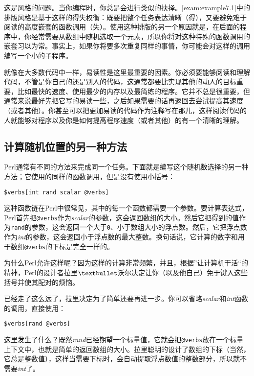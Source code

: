 这是风格的问题。当你编程时，你总是会进行类似的抉择。\autoref{exam:example7.1}中的排版风格是基于这样的得失权衡：既要把整个任务表达清晰（得），又要避免难于阅读的高度嵌套的函数调用（失）。使用这种排版的另一个原因就是，在后面的程序中，你经常需要从数组中随机选取一个元素，所以你将对这种特殊的函数调用的嵌套习以为常。事实上，如果你将要多次重复同样的事情，你可能会对这样的调用编写一个小的子程序。

就像在大多数代码中一样，易读性是这里最重要的因素。你必须要能够阅读和理解代码，不管是你自己的还是别人的代码，这通常都要比实现其他的动人的目标重要，比如最快的速度、使用最少的内存以及最简练的程序。它并不总是很重要，但通常来说最好先把它写的易读一些，之后如果需要的话再返回去尝试提高其速度（或者其他）。你甚至可以把更加易读的代码作为注释写在那儿，这样阅读代码的人就能够对程序以及你是如何提高程序速度（或者其他）的有一个清晰的理解。

\subsection{计算随机位置的另一种方法}
Perl通常有不同的方法来完成同一个任务。下面就是编写这个随机数选择的另一种方法；它使用的同样的函数调用，但是没有使用小括号：

\begin{lstlisting}
$verbs[int rand scalar @verbs]
\end{lstlisting}

这种函数链在Perl中很常见，其中的每一个函数都需要一个参数。要计算表达式，Perl首先把\verb|@verbs|作为\textit{scalar}的参数，这会返回数组的大小。然后它把得到的值作为\verb|rand|的参数，这会返回一个大于\verb|0|、小于数组大小的浮点数。然后，它把浮点数作为\textit{int}的参数，这会返回小于浮点数的最大整数。换句话说，它计算的数字和用于数组\verb|@verbs|的下标是完全一样的。

为什么Perl允许这样呢？因为这样的计算非常频繁，并且，根据”让计算机干活“的精神，Perl的设计者拉里$\textbullet$沃尔决定让你（以及他自己）免于键入这些括号并使其配对的烦恼。

已经走了这么远了，拉里决定为了简单还要再进一步。你可以省略\textit{scalar}和\textit{int}函数的调用，直接使用：

\begin{lstlisting}
$verbs[rand @verbs]
\end{lstlisting}

这里发生了什么？既然\textit{rand}已经期望一个标量值，它就会把\verb|@verbs|放在一个标量上下文中，也就是简单的返回数组的大小。拉里聪明的设计了数组的下标（当然，它总是整数值），这样当需要下标时，会自动提取浮点数值的整数部分，所以就不需要\textit{int}了。

